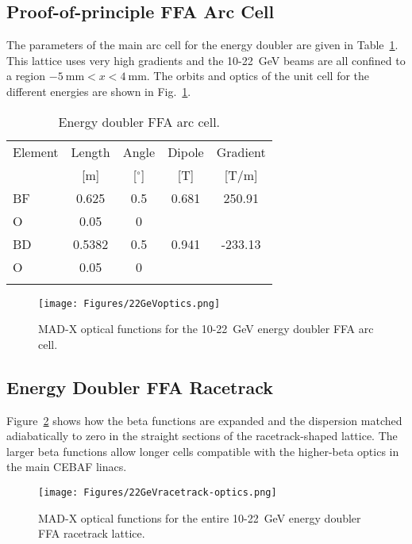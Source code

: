 \subsection{Proof-of-principle FFA Arc Cell}

The parameters of the main arc cell for the energy doubler are given in Table~\ref{tab:22GeV-arc-cell}.  This lattice uses very high gradients and the 10-22~GeV beams are all confined to a region $-5~\mbox{mm}<x<4~\mbox{mm}$. The orbits and optics of the unit cell for the different energies are shown in Fig.~\ref{fig:22GeV-arc-cell}.
\begin{table}[!hbt]
  \centering
  \small
  \begin{tabular}{lcccc} 
  \hline
  Element & Length & Angle & Dipole & Gradient \\
   & [m] & [$^\circ$] & [T] & [T/m] \\
  \hline\hline
  BF & 0.625 & 0.5 & 0.681 & 250.91 \\
  O & 0.05 & 0 & & \\
  BD & 0.5382 & 0.5 & 0.941 & -233.13 \\
  O & 0.05 & 0 & & \\
  \hline
 \\
  \end{tabular}
  \caption{Energy doubler FFA arc cell.}
  \label{tab:22GeV-arc-cell}
\end{table}
%
\begin{figure}[htb]
  \centering
  \texttt{[image: Figures/22GeVoptics.png]}
  \caption{MAD-X optical functions for the 10-22~GeV energy doubler FFA arc cell.}
  \label{fig:22GeV-arc-cell}
\end{figure}
%
\subsection{Energy Doubler FFA Racetrack}
Figure~\ref{fig:22GeV-racetrack} shows how the beta functions are expanded and the dispersion matched adiabatically to zero in the straight sections of the racetrack-shaped lattice.  The larger beta functions allow longer cells compatible with the higher-beta optics in the main CEBAF linacs.
%
\begin{figure}[htb]
  \centering
  \texttt{[image: Figures/22GeVracetrack-optics.png]}
  \caption{MAD-X optical functions for the entire 10-22~GeV energy doubler FFA racetrack lattice.}
  \label{fig:22GeV-racetrack}
\end{figure}
%
%
